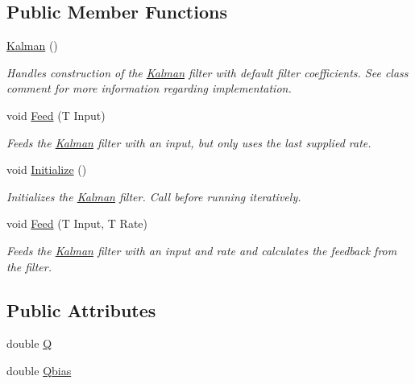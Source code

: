 \subsection*{Public Member Functions}
\begin{DoxyCompactItemize}
\item 
\hyperlink{class_robotics_library_1_1_filters_1_1_kalman_a4c97ac8d96d0ce247be5331d549ff8df}{Kalman} ()
\begin{DoxyCompactList}\small\item\em Handles construction of the \hyperlink{class_robotics_library_1_1_filters_1_1_kalman}{Kalman} filter with default filter coefficients. See class comment for more information regarding implementation.\end{DoxyCompactList}\item 
void \hyperlink{class_robotics_library_1_1_filters_1_1_kalman_a92a029a73d197e692fc35b1f6e0ba238}{Feed} (T Input)
\begin{DoxyCompactList}\small\item\em Feeds the \hyperlink{class_robotics_library_1_1_filters_1_1_kalman}{Kalman} filter with an input, but only uses the last supplied rate.\end{DoxyCompactList}\item 
void \hyperlink{class_robotics_library_1_1_filters_1_1_kalman_aec1fb77c692d3d444d1cbd60f2b2592c}{Initialize} ()
\begin{DoxyCompactList}\small\item\em Initializes the \hyperlink{class_robotics_library_1_1_filters_1_1_kalman}{Kalman} filter. Call before running iteratively.\end{DoxyCompactList}\item 
void \hyperlink{class_robotics_library_1_1_filters_1_1_kalman_a5c2f27a6d48ede3369d4b9ac776954db}{Feed} (T Input, T Rate)
\begin{DoxyCompactList}\small\item\em Feeds the \hyperlink{class_robotics_library_1_1_filters_1_1_kalman}{Kalman} filter with an input and rate and calculates the feedback from the filter.\end{DoxyCompactList}\end{DoxyCompactItemize}
\subsection*{Public Attributes}
\begin{DoxyCompactItemize}
\item 
double \hyperlink{class_robotics_library_1_1_filters_1_1_kalman_a99ad42967bc86d34d72dfac39fa83a56}{Q}
\item 
double \hyperlink{class_robotics_library_1_1_filters_1_1_kalman_ac8d5e6103a05524967572e38492b6ea9}{Qbias}
\end{DoxyCompactItemize}
